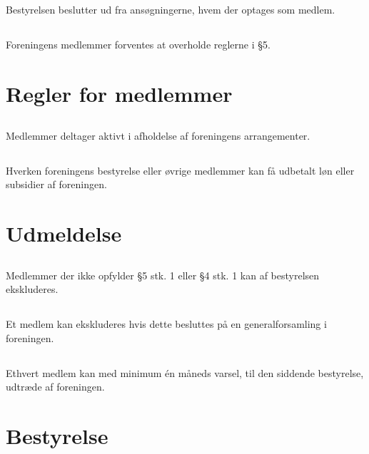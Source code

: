 \documentclass[danish,a4paper,twocolumn,oneside,article]{memoir}
\begin{document}
\section{} Bestyrelsen beslutter ud fra ansøgningerne, hvem der optages som medlem.

\section{} Foreningens medlemmer forventes at overholde reglerne i \S 5.

\chapter{Regler for medlemmer}

\section{} Medlemmer deltager aktivt i afholdelse af foreningens arrangementer.

\section{} Hverken foreningens bestyrelse eller øvrige medlemmer kan få udbetalt løn eller subsidier af
foreningen.


\chapter{Udmeldelse}

\section{} Medlemmer der ikke opfylder \S 5 stk. 1 eller \S 4 stk. 1 kan af bestyrelsen ekskluderes.

\section{} Et medlem kan ekskluderes hvis dette besluttes på en generalforsamling i foreningen.

\section{} Ethvert medlem kan med minimum én måneds varsel, til den siddende bestyrelse, udtræde af foreningen.


\chapter{Bestyrelse}
\end{document}
